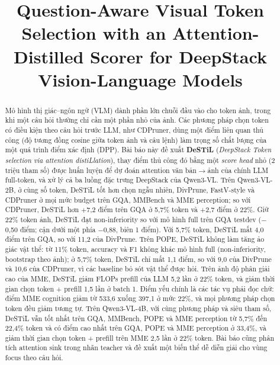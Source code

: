 \documentclass[conference]{IEEEtran}
\newcommand{\mi}{\ensuremath{-}}            %
\newcommand{\pl}{\ensuremath{+}}
\begin{document}
\title{Question-Aware Visual Token Selection with an Attention-Distilled Scorer for DeepStack Vision-Language Models}

\author{
}

\maketitle

\begin{abstract}
Mô hình thị giác--ngôn ngữ (VLM) dành phần lớn chuỗi đầu vào cho token ảnh, trong khi một câu hỏi thường chỉ cần một phần nhỏ của ảnh. Các phương pháp chọn token có điều kiện theo câu hỏi trước LLM, như CDPruner, dùng một điểm liên quan thủ công (độ tương đồng cosine giữa token ảnh và câu lệnh) làm trọng số chất lượng của một quá trình điểm xác định (DPP). Bài báo này đề xuất \textbf{DeSTiL} (\emph{DeepStack Token selection via attention distiLlation}), thay điểm thủ công đó bằng một \emph{score head} nhỏ (2 triệu tham số) được huấn luyện để dự đoán attention văn bản$\rightarrow$ảnh của chính LLM full-token, và xử lý cả ba luồng đặc trưng DeepStack của Qwen3-VL. Trên Qwen3-VL-2B, ở cùng số token, DeSTiL tốt hơn chọn ngẫu nhiên, DivPrune, FastV-style và CDPruner ở mọi mức budget trên GQA, MMBench và MME perception; so với CDPruner, DeSTiL hơn \pl7,2 điểm trên GQA ở 5,7\% token và \pl2,7 điểm ở 22\%. Giữ 22\% token ảnh, DeSTiL đạt non-inferiority so với mô hình full trên GQA testdev (\mi0,50 điểm; cận dưới một phía \mi0,88, biên 1 điểm). Với 5,7\% token, DeSTiL mất 4,0 điểm trên GQA, so với 11,2 của DivPrune. Trên POPE, DeSTiL không làm tăng ảo giác vật thể: từ 11\% token, accuracy và F1 không khác mô hình full (non-inferiority, bootstrap theo ảnh); ở 5,7\% token, DeSTiL chỉ mất 1,1 điểm, so với 9,0 của DivPrune và 10,6 của CDPruner, vì các baseline bỏ sót vật thể được hỏi. Trên ảnh độ phân giải cao của MME, DeSTiL giảm FLOPs prefill của LLM 5,2 lần ở 22\% token, và giảm thời gian chọn token + prefill 1,5 lần ở batch 1. Điểm yếu chính là các tác vụ phải đọc chữ: điểm MME cognition giảm từ 533,6 xuống 397,1 ở mức 22\%, và mọi phương pháp chọn token đều giảm tương tự. Trên Qwen3-VL-4B, với cùng phương pháp và siêu tham số, DeSTiL vẫn tốt nhất trên GQA, MMBench, POPE và MME perception từ 5,7\% đến 22,4\% token và có điểm cao nhất trên GQA, POPE và MME perception ở 33,4\%, và giảm thời gian chọn token + prefill trên MME 2,5 lần ở 22\% token. Bài báo cũng phân tích attention sink trong nhãn teacher và đề xuất một biến thể dễ diễn giải cho vùng focus theo câu hỏi.
\end{abstract}
\end{document}
